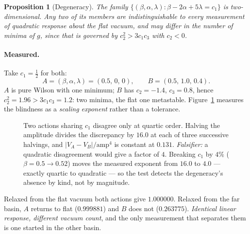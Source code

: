 \documentclass[11pt]{article}
\newtheorem{proposition}{Proposition}
\theoremstyle{remark}
\begin{document}
\begin{proposition}[Degeneracy]\label{prop:ceiling2}
The family $\{(\beta,\alpha,\lambda):\beta-2\alpha+5\lambda=c_1\}$ is two-dimensional.
Any two of its members are indistinguishable to every measurement of quadratic response
about the flat vacuum, and may differ in the number of minima of $g$, since that is
governed by $c_2^2>3c_1c_3$ with $c_2<0$.
\end{proposition}

\paragraph{Measured.} Take $c_1=\tfrac12$ for both:
\[
  A=(\beta,\alpha,\lambda)=(0.5,\,0,\,0), \qquad B=(0.5,\,1.0,\,0.4).
\]
$A$ is pure Wilson with one minimum; $B$ has $c_2=-1.4$, $c_3=0.8$, hence
$c_2^2=1.96>3c_1c_3=1.2$: two minima, the flat one metastable. Figure~\ref{fig:quartic}
measures the blindness as a \emph{scaling exponent} rather than a tolerance.

\begin{figure}[ht]\centering
{}
\caption{Two actions sharing $c_1$ disagree only at quartic order. Halving the amplitude
divides the discrepancy by $16.0$ at each of three successive halvings, and
$|V_A-V_B|/\text{amp}^4$ is constant at $0.131$. \emph{Falsifier:} a quadratic
disagreement would give a factor of $4$. Breaking $c_1$ by $4\%$ ($\beta=0.5\to0.52$)
moves the measured exponent from $16.0$ to $4.0$ --- exactly quartic to quadratic ---
so the test detects the degeneracy's absence by kind, not by magnitude.}
\label{fig:quartic}
\end{figure}

Relaxed from the flat vacuum both actions give $1.000000$. Relaxed from the far basin,
$A$ returns to flat ($0.999881$) and $B$ does not ($0.263775$). \emph{Identical linear
response, different vacuum count}, and the only measurement that separates them is one
started in the other basin.
\end{document}
